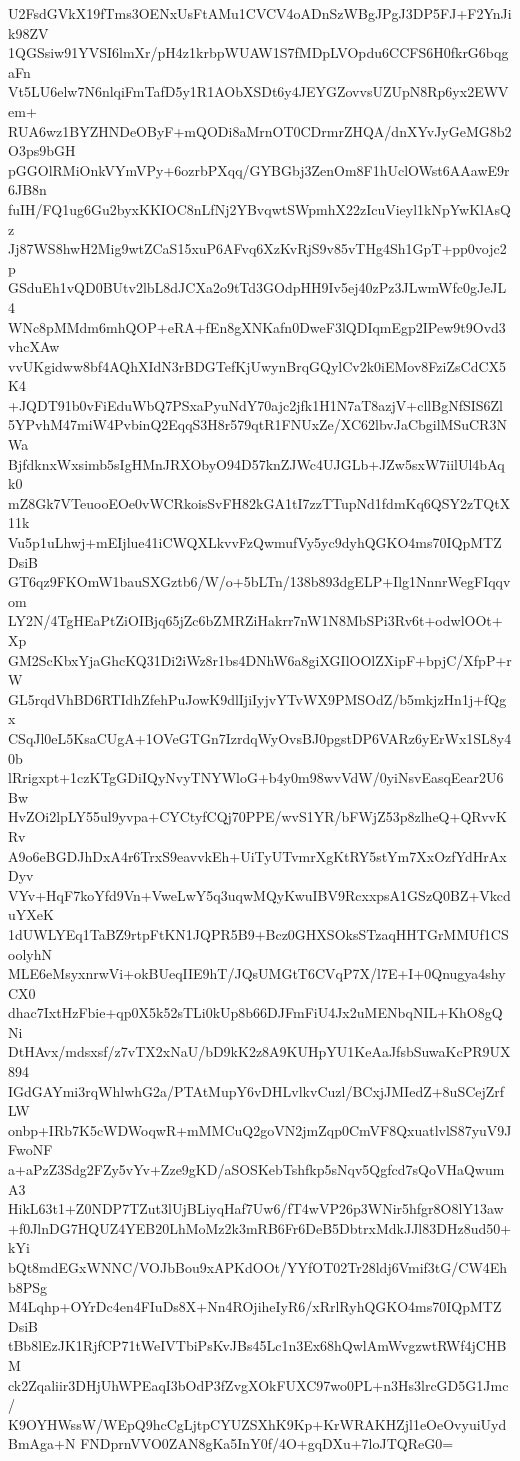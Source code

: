 U2FsdGVkX19fTms3OENxUsFtAMu1CVCV4oADnSzWBgJPgJ3DP5FJ+F2YnJik98ZV
1QGSsiw91YVSI6lmXr/pH4z1krbpWUAW1S7fMDpLVOpdu6CCFS6H0fkrG6bqgaFn
Vt5LU6elw7N6nlqiFmTafD5y1R1AObXSDt6y4JEYGZovvsUZUpN8Rp6yx2EWVem+
RUA6wz1BYZHNDeOByF+mQODi8aMrnOT0CDrmrZHQA/dnXYvJyGeMG8b2O3ps9bGH
pGGOlRMiOnkVYmVPy+6ozrbPXqq/GYBGbj3ZenOm8F1hUclOWst6AAawE9r6JB8n
fuIH/FQ1ug6Gu2byxKKIOC8nLfNj2YBvqwtSWpmhX22zIcuVieyl1kNpYwKlAsQz
Jj87WS8hwH2Mig9wtZCaS15xuP6AFvq6XzKvRjS9v85vTHg4Sh1GpT+pp0vojc2p
GSduEh1vQD0BUtv2lbL8dJCXa2o9tTd3GOdpHH9Iv5ej40zPz3JLwmWfc0gJeJL4
WNc8pMMdm6mhQOP+eRA+fEn8gXNKafn0DweF3lQDIqmEgp2IPew9t9Ovd3vhcXAw
vvUKgidww8bf4AQhXIdN3rBDGTefKjUwynBrqGQylCv2k0iEMov8FziZsCdCX5K4
+JQDT91b0vFiEduWbQ7PSxaPyuNdY70ajc2jfk1H1N7aT8azjV+cllBgNfSIS6Zl
5YPvhM47miW4PvbinQ2EqqS3H8r579qtR1FNUxZe/XC62lbvJaCbgilMSuCR3NWa
BjfdknxWxsimb5sIgHMnJRXObyO94D57knZJWc4UJGLb+JZw5sxW7iilUl4bAqk0
mZ8Gk7VTeuooEOe0vWCRkoisSvFH82kGA1tI7zzTTupNd1fdmKq6QSY2zTQtX11k
Vu5p1uLhwj+mEIjlue41iCWQXLkvvFzQwmufVy5yc9dyhQGKO4ms70IQpMTZDsiB
GT6qz9FKOmW1bauSXGztb6/W/o+5bLTn/138b893dgELP+Ilg1NnnrWegFIqqvom
LY2N/4TgHEaPtZiOIBjq65jZc6bZMRZiHakrr7nW1N8MbSPi3Rv6t+odwlOOt+Xp
GM2ScKbxYjaGhcKQ31Di2iWz8r1bs4DNhW6a8giXGIlOOlZXipF+bpjC/XfpP+rW
GL5rqdVhBD6RTIdhZfehPuJowK9dlIjiIyjvYTvWX9PMSOdZ/b5mkjzHn1j+fQgx
CSqJl0eL5KsaCUgA+1OVeGTGn7IzrdqWyOvsBJ0pgstDP6VARz6yErWx1SL8y40b
lRrigxpt+1czKTgGDiIQyNvyTNYWloG+b4y0m98wvVdW/0yiNsvEasqEear2U6Bw
HvZOi2lpLY55ul9yvpa+CYCtyfCQj70PPE/wvS1YR/bFWjZ53p8zlheQ+QRvvKRv
A9o6eBGDJhDxA4r6TrxS9eavvkEh+UiTyUTvmrXgKtRY5stYm7XxOzfYdHrAxDyv
VYv+HqF7koYfd9Vn+VweLwY5q3uqwMQyKwuIBV9RcxxpsA1GSzQ0BZ+VkcduYXeK
1dUWLYEq1TaBZ9rtpFtKN1JQPR5B9+Bcz0GHXSOksSTzaqHHTGrMMUf1CSoolyhN
MLE6eMsyxnrwVi+okBUeqIIE9hT/JQsUMGtT6CVqP7X/l7E+I+0Qnugya4shyCX0
dhac7IxtHzFbie+qp0X5k52sTLi0kUp8b66DJFmFiU4Jx2uMENbqNIL+KhO8gQNi
DtHAvx/mdsxsf/z7vTX2xNaU/bD9kK2z8A9KUHpYU1KeAaJfsbSuwaKcPR9UX894
IGdGAYmi3rqWhlwhG2a/PTAtMupY6vDHLvlkvCuzl/BCxjJMIedZ+8uSCejZrfLW
onbp+IRb7K5cWDWoqwR+mMMCuQ2goVN2jmZqp0CmVF8QxuatlvlS87yuV9JFwoNF
a+aPzZ3Sdg2FZy5vYv+Zze9gKD/aSOSKebTshfkp5sNqv5Qgfcd7sQoVHaQwumA3
HikL63t1+Z0NDP7TZut3lUjBLiyqHaf7Uw6/fT4wVP26p3WNir5hfgr8O8lY13aw
+f0JlnDG7HQUZ4YEB20LhMoMz2k3mRB6Fr6DeB5DbtrxMdkJJl83DHz8ud50+kYi
bQt8mdEGxWNNC/VOJbBou9xAPKdOOt/YYfOT02Tr28ldj6Vmif3tG/CW4Ehb8PSg
M4Lqhp+OYrDc4en4FIuDs8X+Nn4ROjiheIyR6/xRrlRyhQGKO4ms70IQpMTZDsiB
tBb8lEzJK1RjfCP71tWeIVTbiPsKvJBs45Lc1n3Ex68hQwlAmWvgzwtRWf4jCHBM
ck2Zqaliir3DHjUhWPEaqI3bOdP3fZvgXOkFUXC97wo0PL+n3Hs3lrcGD5G1Jmc/
K9OYHWssW/WEpQ9hcCgLjtpCYUZSXhK9Kp+KrWRAKHZjl1eOeOvyuiUydBmAga+N
FNDprnVVO0ZAN8gKa5InY0f/4O+gqDXu+7loJTQReG0=
